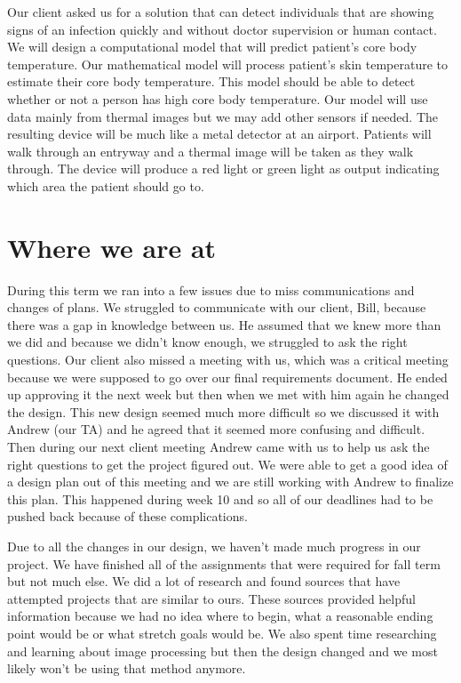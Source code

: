 \documentclass[onecolumn, draftclsnofoot,10pt, compsoc]{IEEEtran}
\begin{document}
Our client asked us for a solution that can detect individuals that are showing signs of an infection quickly and without doctor supervision or human contact. We will design a computational model that will predict patient’s core body temperature. Our mathematical model will process patient's skin temperature to estimate their core body temperature. This model should be able to detect whether or not a person has high core body temperature. Our model will use data mainly from thermal images but we may add other sensors if needed. The resulting device will be much like a metal detector at an airport. Patients will walk through an entryway and a thermal image will be taken as they walk through. The device will produce a red light or green light as output indicating which area the patient should go to.

 \section{Where we are at}
During this term we ran into a few issues due to miss communications and changes of plans. We struggled to communicate with our client, Bill, because there was a gap in knowledge between us. He assumed that we knew more than we did and because we didn’t know enough, we struggled to ask the right questions. Our client also missed a meeting with us, which was a critical meeting because we were supposed to go over our final requirements document. He ended up approving it the next week but then when we met with him again he changed the design. This new design seemed much more difficult so we discussed it with Andrew (our TA) and he agreed that it seemed more confusing and difficult. Then during our next client meeting Andrew came with us to help us ask the right questions to get the project figured out. We were able to get a good idea of a design plan out of this meeting and we are still working with Andrew to finalize this plan. This happened during week 10 and so all of our deadlines had to be pushed back because of these complications.

Due to all the changes in our design, we haven't made much progress in our project. We have finished all of the assignments that were required for fall term but not much else. We did a lot of research and found sources that have attempted projects that are similar to ours. These sources provided helpful information because we had no idea where to begin, what a reasonable ending point would be or what stretch goals would be. We also spent time researching and learning about image processing but then the design changed and we most likely won’t be using that method anymore. 
\end{document}
